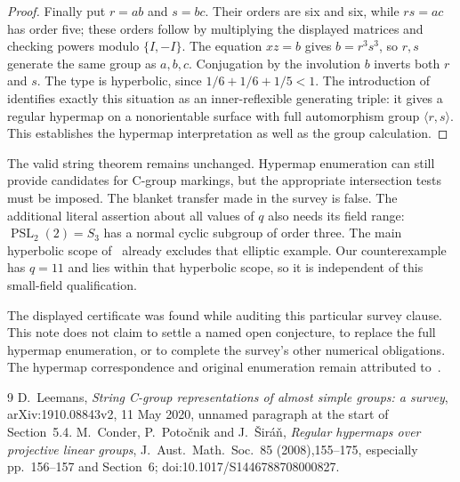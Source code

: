 \documentclass[11pt,a4paper]{article}
\begin{document}
\begin{proof}
Finally put $r=ab$ and $s=bc$. Their orders are six and six, while
$rs=ac$ has order five; these orders follow by multiplying the displayed
matrices and checking powers modulo $\{I,-I\}$. The equation $xz=b$
gives $b=r^3s^3$, so $r,s$ generate the same group as $a,b,c$.
Conjugation by the involution $b$ inverts both $r$ and $s$.
The type is hyperbolic, since $1/6+1/6+1/5<1$.
The introduction of~\cite{CPS} identifies exactly this situation as an
inner-reflexible generating triple: it gives a regular hypermap on a
nonorientable surface with full automorphism group $\langle r,s\rangle$.
This establishes the hypermap interpretation as well as the group calculation.
\end{proof}

The valid string theorem remains unchanged. Hypermap enumeration can
still provide candidates for C-group markings, but the appropriate
intersection tests must be imposed. The blanket transfer made in the
survey is false. The additional literal assertion about all values of
$q$ also needs its field range: $\operatorname{PSL}_2(2)=S_3$ has a normal
cyclic subgroup of order three. The main hyperbolic scope of~\cite{CPS}
already excludes that elliptic example. Our counterexample has $q=11$
and lies within that hyperbolic scope, so it is independent of this
small-field qualification.

The displayed certificate was found while auditing this particular
survey clause. This note does not claim to settle a named open conjecture,
to replace the full hypermap enumeration, or to complete the survey's
other numerical obligations. The hypermap correspondence and original
enumeration remain attributed to~\cite{CPS}.
\begin{thebibliography}{9}
 D.~Leemans, \emph{String C-group representations of
almost simple groups: a survey}, arXiv:1910.08843v2, 11 May 2020,
unnamed paragraph at the start of Section~5.4.
 M.~Conder, P.~Poto\v cnik and J.~\v Sir\'a\v n,
\emph{Regular hypermaps over projective linear groups},
J.~Aust.~Math.~Soc.~85 (2008),155--175, especially pp.~156--157
and Section~6; doi:10.1017/S1446788708000827.
\end{thebibliography}
\end{document}
